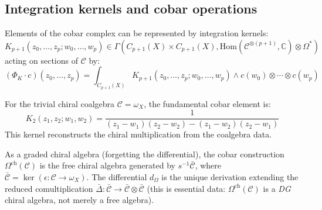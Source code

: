 \subsection{Integration kernels and cobar operations}

\begin{definition}\label{def:cobar-kernel}
Elements of the cobar complex can be represented by integration kernels:
\[
K_{p+1}(z_0, \ldots, z_p; w_0, \ldots, w_p) \in \Gamma\left(C_{p+1}(X) \times C_{p+1}(X), \text{Hom}(\mathcal{C}^{\otimes(p+1)}, \mathbb{C}) \otimes \Omega^*\right)
\]
acting on sections of $\mathcal{C}$ by:
\[
(\Phi_K \cdot c)(z_0, \ldots, z_p) = \int_{C_{p+1}(X)} K_{p+1}(z_0, \ldots, z_p; w_0, \ldots, w_p) \wedge c(w_0) \otimes \cdots \otimes c(w_p)
\]
\end{definition}

\begin{example}\label{ex:fundamental-cobar}
For the trivial chiral coalgebra $\mathcal{C} = \omega_X$, the fundamental cobar element is:
\[
K_2(z_1, z_2; w_1, w_2) = \frac{1}{(z_1 - w_1)(z_2 - w_2) - (z_1 - w_2)(z_2 - w_1)}
\]
This kernel reconstructs the chiral multiplication from the coalgebra data.
\end{example}

\begin{theorem}\label{thm:cobar-free}
As a graded chiral algebra (forgetting the differential), the cobar
construction $\Omega^{\mathrm{ch}}(\mathcal{C})$ is the free chiral
algebra generated by $s^{-1}\bar{\mathcal{C}}$, where
$\bar{\mathcal{C}} = \ker(\epsilon\colon \mathcal{C} \to \omega_X)$.
The differential $d_\Omega$ is the unique derivation extending the
reduced comultiplication
$\bar{\Delta}\colon \bar{\mathcal{C}} \to
\bar{\mathcal{C}} \otimes \bar{\mathcal{C}}$
(this is essential data: $\Omega^{\mathrm{ch}}(\mathcal{C})$ is a
\emph{DG} chiral algebra, not merely a free algebra).
\end{theorem}

